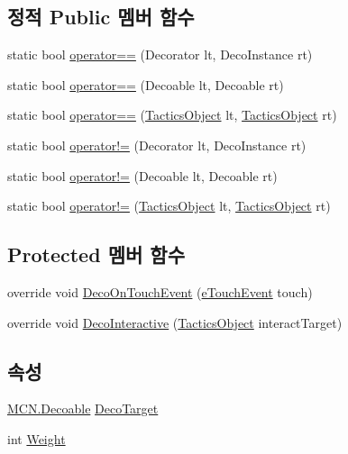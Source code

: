 \subsection*{정적 Public 멤버 함수}
\begin{DoxyCompactItemize}
\item 
static bool \hyperlink{class_m_c_n_1_1_decorator_a4c4c97e4a4dcf1a66e764740a5bbf3c6}{operator==} (Decorator lt, Deco\+Instance rt)
\item 
static bool \hyperlink{class_m_c_n_1_1_decoable_a6004bbc5f208c3031388c9d6e8f8359b}{operator==} (Decoable lt, Decoable rt)
\item 
static bool \hyperlink{class_tactics_object_a18f2979a4bf81dc755fbc17e425809f0}{operator==} (\hyperlink{class_tactics_object}{Tactics\+Object} lt, \hyperlink{class_tactics_object}{Tactics\+Object} rt)
\item 
static bool \hyperlink{class_m_c_n_1_1_decorator_a89e2f61a0974c51610a0c8d14ef6962a}{operator!=} (Decorator lt, Deco\+Instance rt)
\item 
static bool \hyperlink{class_m_c_n_1_1_decoable_aa75e4102ebd7265f577028b407534d27}{operator!=} (Decoable lt, Decoable rt)
\item 
static bool \hyperlink{class_tactics_object_a49e235618a22126faa6271243cd89710}{operator!=} (\hyperlink{class_tactics_object}{Tactics\+Object} lt, \hyperlink{class_tactics_object}{Tactics\+Object} rt)
\end{DoxyCompactItemize}
\subsection*{Protected 멤버 함수}
\begin{DoxyCompactItemize}
\item 
override void \hyperlink{class_move_decorator_ac4276fd2b79d3a3f6a89968e62271623}{Deco\+On\+Touch\+Event} (\hyperlink{_touch_manager_8cs_ae33e321a424fe84ba8b2fdb81ad40a68}{e\+Touch\+Event} touch)
\item 
override void \hyperlink{class_move_decorator_a5d25ac6e9eacf33c5ab0423059ebcadc}{Deco\+Interactive} (\hyperlink{class_tactics_object}{Tactics\+Object} interact\+Target)
\end{DoxyCompactItemize}
\subsection*{속성}
\begin{DoxyCompactItemize}
\item 
\hyperlink{class_m_c_n_1_1_decoable}{M\+C\+N.\+Decoable} \hyperlink{class_m_c_n_1_1_decorator_a1306a0a8b814650cd5970a1ffc7ba2fe}{Deco\+Target}
\item 
int \hyperlink{class_m_c_n_1_1_decorator_a6f6dcca5e0dfb225bcfe2fa73c0ef752}{Weight}
\end{DoxyCompactItemize}
